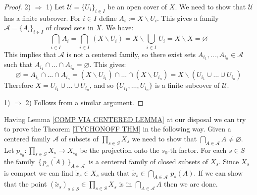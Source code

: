\documentclass[11pt, letterpaper, oneside]{report}
\theoremstyle{pplain}
\newtheorem{ITERMVALUE THM}[theorem]{Intermediate Value Theorem}
\newtheorem{HEINEBOREL THM}[theorem]{Heine-Borel Theorem}
\newtheorem{UMETR THM}[theorem]{Urysohn Metrization Theorem}
\newtheorem{UMETR2 THM}[theorem]{Urysohn Metrization Theorem (v.2)}
\theoremstyle{ddefinition}
\theoremstyle{nnn}
\newtheorem{TDA NN}[theorem]{Topological Data Analysis. }
\theoremstyle{eexercise}
\newcommand{\Ra}{\Rightarrow}
\renewcommand{\AA}{{\mathcal A}}
\newcommand{\UU}{{\mathcal U}}
\newcommand{\ssmin}{\smallsetminus}
\begin{document}
\begin{proof}
2) $\Ra$ 1) Let  $\UU = \{U_{i}\}_{i\in I}$ be an open cover of $X$. We need to show that 
$\UU$ has a finite subcover. For $i\in I $ define $A_{i} := X\ssmin U_{i}$.  This gives a 
family $\AA = \{A_{i}\}_{i\in I}$ of closed sets in $X$. We have:
$$\bigcap_{i\in I} A_{i} = \bigcap_{i\in I} \,(X\ssmin U_{i}) = X \ssmin \bigcup_{i\in I} \, U_{i}  = 
X\ssmin X = \varnothing$$
This implies  that $\AA$ is not a centered family, so 
there exist sets $A_{i_{1}}, \dots, A_{i_{n}} \in \AA$ such that  
$A_{i_{1}}\cap \dots \cap A_{i_{n}}  = \varnothing$. This gives:
$$\varnothing = A_{i_{1}}\cap \dots \cap A_{i_{n}}  
= (X\ssmin U_{i_{1}})\cap \dots \cap (X\ssmin U_{i_{n}}) 
= X \ssmin (U_{i_{1}}\cup \dots \cup U_{i_{n}})$$
Therefore $X = U_{i_{1}}\cup \dots \cup U_{i_{n}}$, and so $\{U_{i_{1}}, \dots, U_{i_{n}}\}$ is 
a finite subcover of  $\UU$. 


1) $\Ra$ 2)  Follows from a similar argument. 
\end{proof}

Having  Lemma \ref{COMP VIA CENTERED LEMMA}  at our disposal 
we can try to prove the  Theorem \ref{TYCHONOFF THM} in the following way. Given a  centered 
family $\AA$ of subsets of $\prod_{s\in S}X_{s}$ we need to show that $\bigcap_{A\in \AA} A \neq \varnothing$. 
Let $p_{s_{0}}\colon \prod_{s\in S} X_{s} \to X_{s_{0}}$ be the projection onto the $s_{0}$-th factor.  
For each $s\in S$ the family $\, \{\, \overline{p_{s}(A)}\, \}_{A\in \AA}\,$ is a centered family of closed subsets  
of $X_{s}$. Since $X_{s}$ is  compact  we can find $\tilde x_{s}\in X_{s}$ such that 
$\tilde x_{s}\in \bigcap_{A\in \AA} \, \overline{p_{s}(A)}$. If we can show that the point 
$(\tilde x_{s})_{s\in S}\in \prod_{s\in S} X_{s}$ is in  $\bigcap_{A\in \AA} A$ then we are done. 
\end{document}
